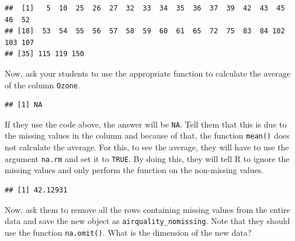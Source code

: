 \documentclass[]{book}
\newenvironment{Shaded}{\begin{snugshade}}{\end{snugshade}}
\newcommand{\DataTypeTok}[1]{\textcolor[rgb]{0.13,0.29,0.53}{#1}}
\newcommand{\KeywordTok}[1]{\textcolor[rgb]{0.13,0.29,0.53}{\textbf{#1}}}
\newcommand{\NormalTok}[1]{#1}
\newcommand{\OperatorTok}[1]{\textcolor[rgb]{0.81,0.36,0.00}{\textbf{#1}}}
\newcommand{\OtherTok}[1]{\textcolor[rgb]{0.56,0.35,0.01}{#1}}
\begin{document}
\begin{Shaded}
\end{Shaded}

\begin{verbatim}
##  [1]   5  10  25  26  27  32  33  34  35  36  37  39  42  43  45  46  52
## [18]  53  54  55  56  57  58  59  60  61  65  72  75  83  84 102 103 107
## [35] 115 119 150
\end{verbatim}

Now, ask your students to use the appropriate function to calculate the average of the column \texttt{Ozone}.

\begin{Shaded}
\end{Shaded}

\begin{verbatim}
## [1] NA
\end{verbatim}

If they use the code above, the answer will be \texttt{NA}. Tell them that this is due to the missing values in the column and because of that, the function \texttt{mean()} does not calculate the average. For this, to see the average, they will have to use the argument \texttt{na.rm} and set it to \texttt{TRUE}. By doing this, they will tell R to ignore the missing values and only perform the function on the non-missing values.

\begin{Shaded}
\end{Shaded}

\begin{verbatim}
## [1] 42.12931
\end{verbatim}

Now, ask them to remove all the rows containing missing values from the entire data and save the new object as \texttt{airquality\_nomissing}. Note that they should use the function \texttt{na.omit()}. What is the dimension of the new data?
\end{document}
